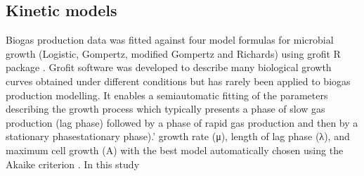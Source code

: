 \subsection{Kinetic models}
Biogas production data was fitted against four model formulas for microbial growth (Logistic, Gompertz, modified Gompertz and Richards) using grofit R package \cite{Kahm_2010}. Grofit software was developed to describe many biological growth curves obtained under different conditions but has rarely been applied to biogas production modelling. It enables a semiautomatic fitting of the parameters describing the growth process which typically presents a phase of slow gas production (lag phase) followed by a phase of rapid gas production and then by a stationary phasestationary phase).’ growth rate (μ), length of lag phase (λ), and maximum cell growth (A) with the best model automatically chosen using the Akaike criterion \cite{Hasenbrink_2006}. In this study